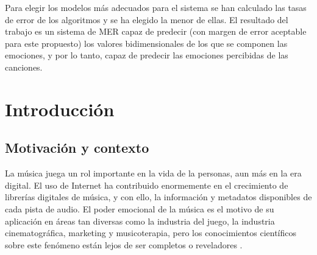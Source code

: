 \documentclass[12pt,a4paper]{article}
\newcommand\blankpage{%
	\null
	\thispagestyle{empty}%
	\newpage}
\begin{document}
Para elegir los modelos más adecuados para el sistema se han calculado las tasas de error de los algoritmos y se ha elegido la menor de ellas. El resultado del trabajo es un sistema de MER capaz de predecir (con margen de error aceptable para este propuesto) los valores bidimensionales de los que se componen las emociones, y por lo tanto, capaz de predecir las emociones percibidas de las canciones.








\newpage
\renewcommand*\contentsname{Índice} %
\tableofcontents
\afterpage{\blankpage} %




\newpage
\renewcommand{\listtablename}{Índice de tablas} %
\listoftables %




\newpage
\renewcommand{\listfigurename}{Índice de figuras} %
\listoffigures %






\newpage
\section{Introducción}
\subsection{Motivación y contexto}
La música juega un rol importante en la vida de la personas, aun más en la era digital. El uso de Internet ha contribuido enormemente en el crecimiento de librerías digitales de música, y con ello, la información y metadatos disponibles de cada pista de audio. El poder emocional de la música es el motivo de su aplicación en áreas tan diversas como la industria del juego, la industria cinematográfica, marketing y musicoterapia, pero los conocimientos científicos sobre este fenómeno están lejos de ser completos o reveladores \cite{eerola2012review}.
\end{document}
